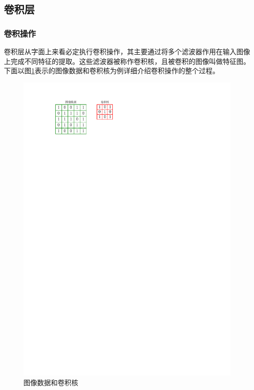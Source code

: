 \subsection{卷积层}
\subsubsection{卷积操作}
卷积层从字面上来看必定执行卷积操作，其主要通过将多个滤波器作用在输入图像上完成不同特征的提取。这些滤波器被称作卷积核，且被卷积的图像叫做特征图。下面以图\ref{figure:figure2}表示的图像数据和卷积核为例详细介绍卷积操作的整个过程。

\begin{figure}[htbp]
    \begin{center}
    \includegraphics{figures/conv.pdf}
    \end{center}
    \caption{图像数据和卷积核}\label{figure:figure2}
\end{figure}


